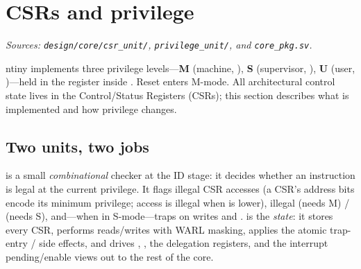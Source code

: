 \section{CSRs and privilege}
\textit{Sources: \texttt{design/core/csr\_unit/}, \texttt{privilege\_unit/}, and
\texttt{core\_pkg.sv}.}

ntiny implements three privilege levels---\textbf{M} (machine, ),
\textbf{S} (supervisor, ), \textbf{U} (user, )---held in
the  register inside . Reset enters M-mode. All
architectural control state lives in the Control/Status Registers (CSRs); this
section describes what is implemented and how privilege changes.


\subsection{Two units, two jobs}
 is a small \emph{combinational} checker at the ID stage: it
decides whether an instruction is legal at the current privilege. It flags
illegal CSR accesses (a CSR's address bits \sig{[9:8]} encode its minimum
privilege; access is illegal when  is lower), illegal
 (needs M) /  (needs S), and---when  in
S-mode---traps on  writes and .  is the
\emph{state}: it stores every CSR, performs reads/writes with WARL masking,
applies the atomic trap-entry /  side effects, and drives
, , the delegation registers, and the interrupt
pending/enable views out to the rest of the core.

